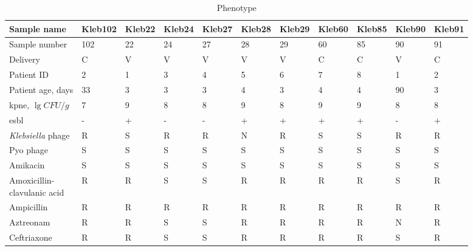 \begin{table}\label{tab:phenotype}
\begin{threeparttable}
\scriptsize

\caption{Phenotype}

\begin{tabular}{lllllllllll}
\toprule
                 Sample name & Kleb102 & Kleb22 & Kleb24 & Kleb27 & Kleb28 & Kleb29 & Kleb60 & Kleb85 & Kleb90 & Kleb91 \\
\midrule
               Sample number &     102 &     22 &     24 &     27 &     28 &     29 &     60 &     85 &     90 &     91 \\
                    Delivery &       C &      V &      V &      V &      V &      V &      C &      C &      V &      C \\
                  Patient ID &       2 &      1 &      3 &      4 &      5 &      6 &      7 &      8 &      1 &      2 \\
           Patient age, days &      33 &      3 &      3 &      3 &      4 &      3 &      4 &      4 &     90 &      3 \\
          \mCL{\gls{kpne},\\
             $\lg{CFU / g}$} &       7 &      9 &      8 &      8 &      9 &      8 &      9 &      9 &      8 &      8 \\
                  \gls{esbl} &       - &      + &      - &      - &      + &      + &      + &      + &      - &      + \\
   \textit{Klebsiella} phage &       R &      S &      R &      R &      N &      R &      S &      S &      R &      R \\
                   Pyo phage &       S &      S &      S &      S &      S &      S &      S &      S &      S &      S \\
                    Amikacin &       S &      S &      S &      S &      S &      S &      S &      S &      S &      S \\
         \mCL{Amoxicillin-\\
            clavulanic acid} &       R &      R &      S &      S &      R &      R &      R &      R &      S &      R \\
                  Ampicillin &       R &      R &      R &      R &      R &      R &      R &      R &      R &      R \\
                   Aztreonam &       R &      R &      S &      S &      R &      R &      R &      R &      N &      R \\
                 Ceftriaxone &       R &      R &      S &      S &      R &      R &      R &      R &      S &      R \\

\end{tabular}
\end{threeparttable}
\end{table}
